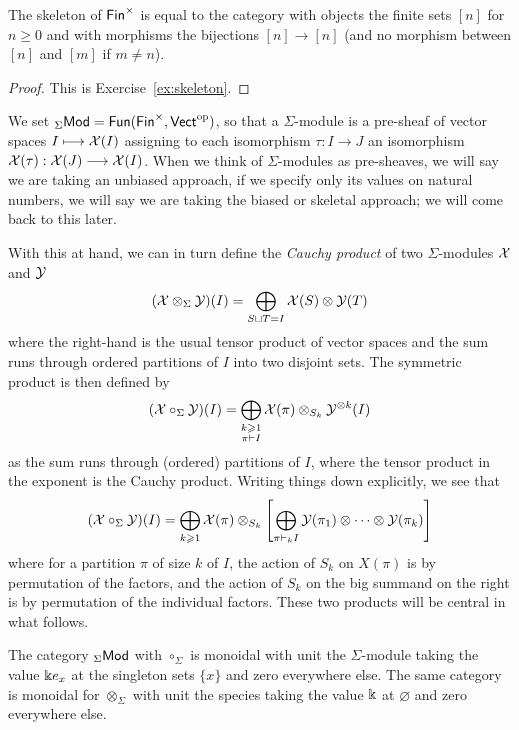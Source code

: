 \begin{lemma} The skeleton of $\mathsf{Fin}^\times$ is
equal to the category with objects the finite sets
$[n]$ for $n\geqslant 0$ and with morphisms the
bijections $[n]\longrightarrow [n]$ (and no morphism
between $[n]$ and $[m]$ if $m\neq n$).
\end{lemma}

\begin{proof}
This is Exercise~\ref{ex:skeleton}.
\end{proof}

We set ${}_\Sigma\mathsf{Mod}  = 
\mathsf{Fun}(\mathsf{Fin}^\times,\mathsf{Vect}^{\mathrm{op}})$,
so that a $\Sigma$-module is a pre-sheaf of vector
spaces $I\longmapsto \mathcal{X}(I)$ assigning to each
isomorphism $\tau : I\longrightarrow J$ an isomorphism
$\mathcal{X}(\tau): \mathcal{X}(J)\longrightarrow \mathcal{X}(I)$. When we
think of $\Sigma$-modules as pre-sheaves, we will say we 
are taking an unbiased approach, if we specify only
its values on natural numbers, we will say we are taking the
biased or skeletal approach; we will come back to this later.

With this at hand, 
we can in turn define the \emph{Cauchy product}
of two $\Sigma$-modules $\mathcal{X}$ and $\mathcal{Y}$
\[ (\mathcal{X}\otimes_\Sigma \mathcal{Y})(I) = 
 	\bigoplus_{S\sqcup T= I}
 		 \mathcal{X}(S)\otimes \mathcal{Y}(T)\] 
where the right-hand is the usual tensor product of
vector spaces
and the sum runs through ordered 
partitions of $I$ into
two disjoint sets. The symmetric product is then
defined by 
\[ (\mathcal{X}\circ_\Sigma \mathcal{Y})(I) 
 	= \bigoplus_{\substack{k\geqslant 1 \\ \pi \vdash I}} \mathcal{X}(\pi) 
 		\otimes_{S_k} \mathcal{Y}^{\otimes k}(I)\] 
as the sum runs through (ordered) partitions of $I$, where the tensor product in the exponent is
the Cauchy product. Writing things down 
explicitly, we see that 
\[ (\mathcal{X}\circ_\Sigma \mathcal{Y})(I) 
 	= \bigoplus_{k\geqslant 1}\mathcal{X}(\pi) 
 		\otimes_{S_k} 
 		\left[
 		\bigoplus_{\pi\vdash_k I}\mathcal{Y}(\pi_1)\otimes\cdots\otimes
 			\mathcal{Y}(\pi_k) \right]\]
where for a partition $\pi$ of size $k$ of $I$,
the action of $S_k$ on $X(\pi)$ is by permutation
of the factors, and the action of $S_k$
on the big summand on the right is by permutation
of the individual factors. 
These two products will be central in what follows.

\begin{lemma}
The category ${}_\Sigma\mathsf{Mod}$ with $\circ_\Sigma$ is
monoidal with unit the $\Sigma$-module taking the value $\Bbbk e_x$ at 
the singleton sets $\{x\}$ and zero everywhere else. The same
category is monoidal for $\otimes_\Sigma$ with unit
the species taking the value $\Bbbk$ at $\varnothing$
and zero everywhere else.
\end{lemma}

